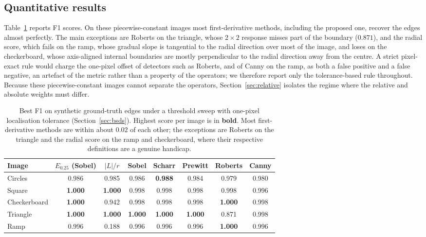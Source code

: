 \documentclass[conference]{IEEEtran}
\begin{document}
\subsection{Quantitative results}
Table~\ref{tab:results} reports F1 scores.  On these piecewise-constant
images most first-derivative methods, including the proposed one, recover the
edges almost perfectly.  The main exceptions are Roberts on the triangle, whose
$2\times2$ response misses part of the boundary ($0.871$), and the radial
score, which fails on the ramp, whose gradual slope is tangential to the radial
direction over most of the image, and loses on the checkerboard, whose axis-aligned
internal boundaries are mostly perpendicular to the radial direction away from the
centre.  A strict pixel-exact rule
would charge the one-pixel offset of detectors such as Roberts, and of Canny on
the ramp, as both a false positive and a false negative, an artefact of the
metric rather than a property of the operators; we therefore report only the
tolerance-based rule throughout.  Because these piecewise-constant images cannot
separate the operators, Section~\ref{sec:relative} isolates the regime where the
relative and absolute weights must differ.

\begin{table}[!t]
\centering
\footnotesize
\caption{Best F1 on synthetic ground-truth edges under a threshold sweep with
one-pixel localisation tolerance (Section~\ref{sec:bsds}).
Highest score per image is in \textbf{bold}.  Most first-derivative methods are
within about $0.02$ of each other; the exceptions are Roberts on the triangle and
the radial score on the ramp and checkerboard, where their respective definitions
are a genuine handicap.}
\label{tab:results}
\setlength{\tabcolsep}{2pt}
%
\begin{tabular}{@{}lccccccc@{}}
\toprule
Image & $E_{0.25}$ (Sobel) & $|L|/r$ & Sobel & Scharr & Prewitt & Roberts & Canny \\
\midrule
Circles      & 0.986 & 0.985 & 0.986 & \textbf{0.988} & 0.984 & 0.979 & 0.980 \\
Square       & \textbf{1.000} & \textbf{1.000} & 0.998 & 0.998 & 0.998 & 0.998 & 0.996 \\
Checkerboard & \textbf{1.000} & 0.942 & 0.998 & 0.998 & 0.998 & \textbf{1.000} & 0.998 \\
Triangle     & \textbf{1.000} & \textbf{1.000} & \textbf{1.000} & \textbf{1.000} & \textbf{1.000} & 0.871 & 0.998 \\
Ramp         & 0.996 & 0.188 & 0.996 & 0.996 & 0.996 & \textbf{1.000} & 0.996 \\
\bottomrule
\end{tabular}%

\end{table}
\end{document}
